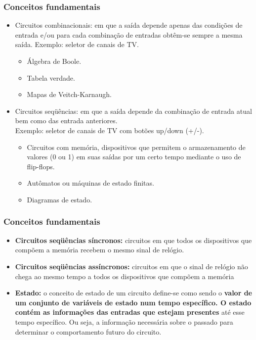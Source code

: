 \documentclass{beamer}
\begin{document}
\begin{frame}
 \frametitle{Conceitos fundamentais}
 \begin{itemize}
  \item Circuitos combinacionais: em que a saída depende apenas das condições de entrada e/ou para cada combinação de entradas obtêm-se sempre a mesma saída. 
	Exemplo: seletor de canais de TV.\pause
  \begin{itemize}
   \item Álgebra de Boole. \pause
   \item Tabela verdade. \pause
   \item Mapas de Veitch-Karnaugh.
  \end{itemize}
 \end{itemize}
\end{frame}

\begin{frame}
 \begin{itemize}
  \item Circuitos seqüências: em que a saída depende da combinação de entrada atual bem como das entrada anteriores. \\Exemplo: seletor de canais de TV com botões up/down (+/-).\pause
  \begin{itemize}
   \item Circuitos com memória, dispositivos que permitem o armazenamento de valores (0 ou 1) em suas saídas por um certo tempo mediante o uso de flip-flops.\pause
   \item Autômatos ou máquinas de estado finitas. \pause
   \item Diagramas de estado.
  \end{itemize}

 \end{itemize}
\end{frame}

\begin{frame}
  \frametitle{Conceitos fundamentais}
  \begin{itemize}
   \item \textbf{Circuitos seqüências síncronos:} circuitos em que todos os dispositivos que compõem a memória recebem o mesmo sinal de relógio.\pause
   \item \textbf{Circuitos seqüências assíncronos:} circuitos em que o sinal de relógio não chega ao mesmo tempo a todos os dispositivos que compõem a memória \pause
   \item \textbf{Estado:} o conceito de estado de um circuito define-se como sendo o \textbf{valor de um conjunto de variáveis de estado num tempo específico. O estado contém as 
	 informações das entradas que estejam presentes} até esse tempo específico.  Ou seja, a informação necessária sobre o passado para determinar o comportamento 
	 futuro do circuito.
  \end{itemize}
\end{frame}
\end{document}
